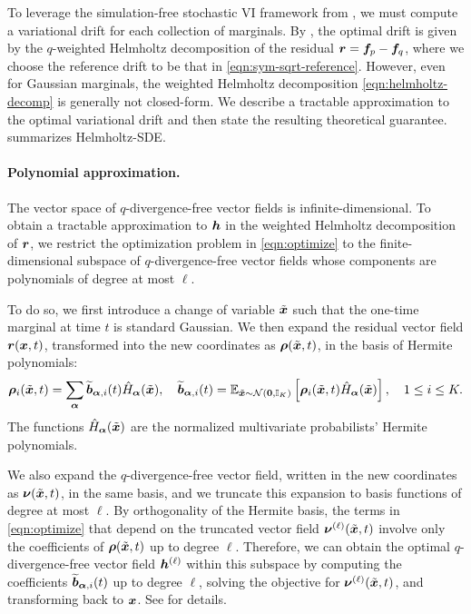 To leverage the simulation-free stochastic VI framework from , we must compute a variational drift for each collection of marginals. 
By , the optimal drift is given by the $q$-weighted Helmholtz decomposition of the residual $\boldsymbol{r} = \boldsymbol{f}_p - \boldsymbol{f}_q$, where we choose the reference drift to be that in \cref{eqn:sym-sqrt-reference}. 
However, even for Gaussian marginals, the weighted Helmholtz decomposition \cref{eqn:helmholtz-decomp} is generally not closed-form. 
We describe a tractable approximation to the optimal variational drift and then state the resulting theoretical guarantee. 
 summarizes Helmholtz-SDE.

\paragraph{Polynomial approximation.}
The vector space of $q$-divergence-free vector fields is infinite-dimensional.
To obtain a tractable approximation to $\boldsymbol{h}$ in the weighted Helmholtz decomposition of $\boldsymbol{r}$, we restrict the optimization problem in \cref{eqn:optimize} to the finite-dimensional subspace of $q$-divergence-free vector fields whose components are polynomials of degree at most $\ell$.

To do so, we first introduce a change of variable $\tilde{\boldsymbol{x}}$ such that the one-time marginal at time $t$ is standard Gaussian.
We then expand the residual vector field $\boldsymbol{r}(\boldsymbol{x}, t)$, transformed into the new coordinates as $\boldsymbol{\rho}(\tilde{\boldsymbol{x}},t)$, in the basis of Hermite polynomials:
\begin{equation}\label{eqn:hermite-expansion}
\boldsymbol{\rho}_i(\tilde{\boldsymbol{x}},t) = \sum_{\boldsymbol{\alpha}} \widetilde{\boldsymbol{b}}_{\boldsymbol{\alpha},i}(t) \hat{H}_{\boldsymbol{\alpha}}(\tilde{\boldsymbol{x}}), \quad \widetilde{\boldsymbol{b}}_{\boldsymbol{\alpha},i}(t)= \mathbb{E}_{\tilde{\boldsymbol{x}}\sim\mathcal{N}(\boldsymbol{0},\mathbb{I}_K)} \left[\boldsymbol{\rho}_i(\tilde{\boldsymbol{x}},t)\hat{H}_{\boldsymbol{\alpha}}(\tilde{\boldsymbol{x}})\right], \quad 1\leq i\leq K.
\end{equation}
The functions $\hat{H}_{\boldsymbol{\alpha}}(\tilde{\boldsymbol{x}})$ are the normalized multivariate probabilists' Hermite polynomials.

We also expand the $q$-divergence-free vector field, written in the new coordinates as $\boldsymbol{\nu}(\tilde{\boldsymbol{x}},t)$, in the same basis, and we truncate this expansion to basis functions of degree at most $\ell$.
By orthogonality of the Hermite basis, the terms in  \cref{eqn:optimize} that depend on the truncated vector field $\boldsymbol{\nu}^{(\ell)}(\tilde{\boldsymbol{x}},t)$ involve only the coefficients of $\boldsymbol{\rho}(\tilde{\boldsymbol{x}},t)$ up to degree $\ell$.
Therefore, we can obtain the optimal $q$-divergence-free vector field $\boldsymbol{h}^{(\ell)}$ within this subspace by computing the coefficients $\widetilde{\boldsymbol{b}}_{\boldsymbol{\alpha},i}(t)$ up to degree $\ell$, solving the objective for $\boldsymbol{\nu}^{(\ell)}(\tilde{\boldsymbol{x}},t)$, and transforming back to $\boldsymbol{x}$. 
See  for details.

